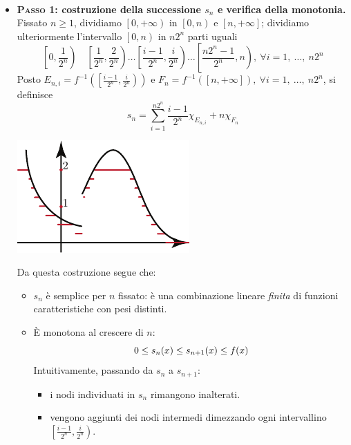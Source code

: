 \begin{demonstration}~{}
	\begin{itemize}
		\item \textbf{\textsc{Passo 1}: costruzione della successione $s_n$ e verifica della monotonia.}\\
		Fissato $n\geq 1$, dividiamo $\left[0,+\infty\right)$ in $\left[0,n\right)$ e $\left[n,+\infty\right]$; dividiamo ulteriormente l'intervallo $\left[0,n\right)$ in $n2^n$ parti uguali
		\begin{equation*}
			\left[0,\frac{1}{2^n}\right)\quad\left[\frac{1}{2^n},\frac{2}{2^n}\right)\ldots\left[\frac{i-1}{2^n},\frac{i}{2^n}\right)\ldots\left[\frac{n2^n-1}{2^n},n\right),\ \forall i=1,\ \ldots,\ n2^n
		\end{equation*}
	Posto $E_{n,i}=f^{-1}\left(\left[\frac{i-1}{2^n},\frac{i}{2^n}\right)\right)$ e $F_n=f^{-1}\left(\left[n,+\infty\right]\right),\ \forall i=1,\ \ldots,\ n2^n$, si definisce
	\begin{equation}
		s_n=\sum_{i=1}^{n2^n}\frac{i-1}{2^n}\chi_{E_{n,i}}+n\chi_{F_n}
	\end{equation}
\begin{center}
	\includegraphics[trim=0cm 0cm 0cm 0cm, clip, scale=1.3]{images/approssimazione1}
\end{center}
Da questa costruzione segue che:
\begin{itemize}
	\item $s_n$ è semplice per $n$ fissato: è una combinazione lineare \textit{finita} di funzioni caratteristiche con pesi distinti.
	\item È monotona al crescere di $n$:\vspace{-3mm}
	\begin{equation*}
		0\leq s_n(x)\leq s_{n+1}(x)\leq f(x)\vspace{-3mm}
	\end{equation*}
	Intuitivamente, passando da $s_n$ a $s_{n+1}$:
	\begin{itemize}
		\item i nodi individuati in $s_n$ rimangono inalterati.
		\item vengono aggiunti dei nodi intermedi dimezzando ogni intervallino $\left[\frac{i-1}{2^n},\frac{i}{2^n}\right)$.

\end{itemize}
\end{itemize}
\end{itemize}
\end{demonstration}

